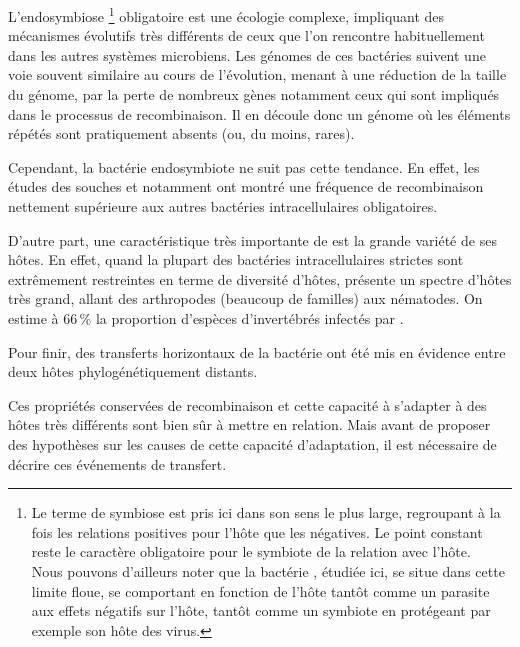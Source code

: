 L'endosymbiose%
\footnote{Le terme de symbiose est pris ici dans son sens le plus large,
regroupant à la fois les relations positives pour l'hôte que les négatives. Le
point constant reste le caractère obligatoire pour le symbiote de la relation
avec l'hôte.\\ Nous pouvons d'ailleurs noter que la bactérie ,
étudiée ici, se situe dans cette limite floue, se comportant en fonction de
l'hôte tantôt comme un parasite aux effets négatifs sur
l'hôte\cite{Werren2008}, tantôt comme un symbiote en protégeant par exemple
son hôte des virus.}
obligatoire est une écologie complexe, impliquant des mécanismes évolutifs
très différents de ceux que l'on rencontre habituellement dans les autres
systèmes microbiens. Les génomes de ces bactéries suivent une voie souvent
similaire au cours de l'évolution, menant à une réduction de la taille du
génome, par la perte de nombreux gènes\cite{wernegreen2002} notamment ceux qui
sont impliqués dans le processus de recombinaison. Il en découle donc un
génome où les éléments répétés sont pratiquement absents (ou, du moins,
rares\cite{Bordenstein2005}).

Cependant, la bactérie endosymbiote  ne suit pas cette
tendance. En effet, les études des souches  et  notamment
ont montré une fréquence de recombinaison nettement supérieure aux autres
bactéries intracellulaires obligatoires\cite{Wu2004}.

D'autre part, une caractéristique très importante de  est la
grande variété de ses hôtes.  En effet, quand la plupart des bactéries
intracellulaires strictes sont extrêmement restreintes en terme de diversité
d'hôtes,  présente un spectre d'hôtes très grand, allant des
arthropodes (beaucoup de familles) aux nématodes. On estime à 66\,\% la
proportion d'espèces d'invertébrés infectés par
\cite{hilgenboecker2008}.

Pour finir, des transferts horizontaux de la bactérie ont été mis en évidence
\cite{vavre1999} entre deux hôtes phylogénétiquement distants.

Ces propriétés conservées de recombinaison et cette capacité à s'adapter à des
hôtes très différents sont bien sûr à mettre en relation.
Mais avant de proposer des hypothèses sur les causes de cette capacité
d'adaptation, il est nécessaire de décrire ces événements de transfert.

